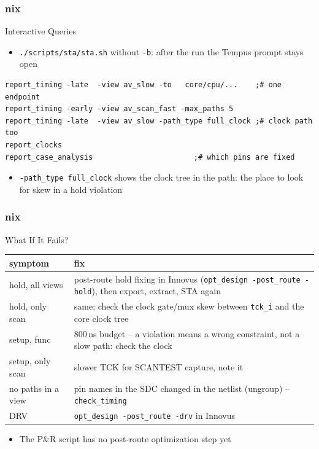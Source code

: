 \documentclass{beamer}
\newcommand{\astitle}{nix}
\newcommand{\assubtitle}{nix}
\newcommand{\cmd}[1]{\texttt{#1}}
\begin{document}
\renewcommand{\assubtitle}{Interactive Queries}
\begin{frame}[fragile]
\frametitle{\astitle}
\begin{block}{\assubtitle}
  \begin{itemize}
    \item \cmd{./scripts/sta/sta.sh} without \cmd{-b}: after the run the
      Tempus prompt stays open
  \end{itemize}
\begin{lstlisting}[style=sh]
report_timing -late  -view av_slow -to   core/cpu/...    ;# one endpoint
report_timing -early -view av_scan_fast -max_paths 5
report_timing -late  -view av_slow -path_type full_clock ;# clock path too
report_clocks
report_case_analysis                       ;# which pins are fixed
\end{lstlisting}
  \begin{itemize}
    \item \cmd{-path\_type full\_clock} shows the clock tree in the path:
      the place to look for skew in a hold violation
  \end{itemize}
\end{block}
\end{frame}

\renewcommand{\assubtitle}{What If It Fails?}
\begin{frame}
\frametitle{\astitle}
\begin{block}{\assubtitle}
  \footnotesize
  \begin{tabularx}{\linewidth}{@{}lY@{}}
    \textbf{symptom} & \textbf{fix}\\\hline
    hold, all views   & post-route hold fixing in Innovus
                        (\cmd{opt\_design -post\_route -hold}), then
                        export, extract, STA again\\
    hold, only scan   & same; check the clock gate/mux skew between
                        \cmd{tck\_i} and the core clock tree\\
    setup, func       & 800\,ns budget -- a violation means a wrong
                        constraint, not a slow path: check the clock\\
    setup, only scan  & slower TCK for SCANTEST capture, note it\\
    no paths in a view & pin names in the SDC changed in the netlist
                        (ungroup) -- \cmd{check\_timing}\\
    DRV               & \cmd{opt\_design -post\_route -drv} in Innovus\\
  \end{tabularx}
  \vspace{4pt}
  \begin{itemize}
    \item The P\&R script has no post-route optimization step yet
  \end{itemize}
\end{block}
\end{frame}
\end{document}
